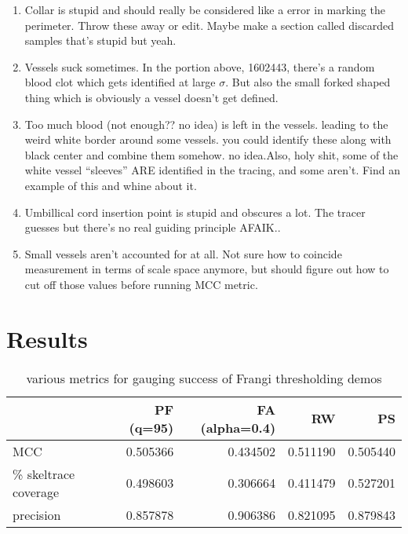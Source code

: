 \begin{enumerate}
\item Collar is stupid and should really be considered like a error in marking the perimeter. Throw these away or edit. Maybe make a section called discarded samples that's stupid but yeah.
\item Vessels suck sometimes. In the portion above, 1602443, there's a random blood clot which gets identified at large $\sigma$. But also the small forked shaped thing which is obviously a vessel doesn't get defined.
\item Too much blood (not enough?? no idea) is left in the vessels. leading to the weird white border around some vessels. you could identify these along with black center and combine them somehow. no idea.Also, holy shit, some of the white vessel ``sleeves'' ARE identified in the tracing, and some aren't. Find an example of this and whine about it.
\item Umbillical cord insertion point is stupid and obscures a lot. The tracer guesses but there's no real guiding principle AFAIK..
\item Small vessels aren't accounted for at all. Not sure how to coincide measurement in terms of scale space anymore, but should figure out how to cut off those values before running MCC metric.
\end{enumerate}





\section{Results}
\begin{table}
\begin{tabular}{lrrrr}
  {} &  PF (q=95) &  FA (alpha=0.4) &  RW &  PS \\
  \hline
  MCC                  &                     0.505366 &                     0.434502 &      0.511190 &          0.505440 \\
  \% skeltrace coverage &                     0.498603 &                     0.306664 &      0.411479 &          0.527201 \\
  precision            &                     0.857878 &                     0.906386 &      0.821095 &          0.879843 \\
\end{tabular}
\caption{various metrics for gauging success of Frangi thresholding demos}
\end{table}


